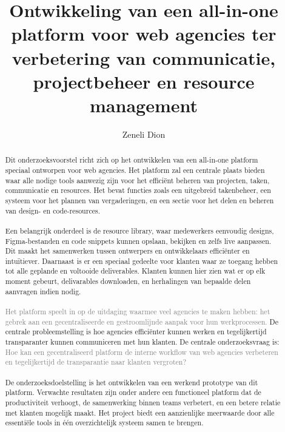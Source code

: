 \documentclass{hogent-article}
\title{Ontwikkeling van een all-in-one platform voor web agencies ter verbetering van communicatie, projectbeheer en resource management}
\author{Zeneli Dion}
\begin{document}
    
    \begin{abstract}
      Dit onderzoeksvoorstel richt zich op het ontwikkelen van een all-in-one platform speciaal ontworpen voor web agencies. Het platform zal een centrale plaats bieden waar alle nodige tools aanwezig zijn voor het efficiënt beheren van projecten, taken, communicatie en resources. Het bevat functies zoals een uitgebreid takenbeheer, een systeem voor het plannen van vergaderingen, en een sectie voor het delen en beheren van design- en code-resources.
      \\
      \\
      Een belangrijk onderdeel is de resource library, waar medewerkers eenvoudig designs, Figma-bestanden en code snippets kunnen opslaan, bekijken en zelfs live aanpassen. Dit maakt het samenwerken tussen ontwerpers en ontwikkelaars efficiënter en intuïtiever. Daarnaast is er een speciaal gedeelte voor klanten waar ze toegang hebben tot alle geplande en voltooide deliverables. Klanten kunnen hier zien wat er op elk moment gebeurt, delivarables downloaden, en herhalingen van bepaalde delen aanvragen indien nodig.
      \\
      \\
      \textcolor{gray}{Het platform speelt in op de uitdaging waarmee veel agencies te maken hebben: het gebrek aan een gecentraliseerde en gestroomlijnde aanpak voor hun werkprocessen.} De centrale probleemstelling is hoe agencies efficiënter kunnen werken en tegelijkertijd transparanter kunnen communiceren met hun klanten. De centrale onderzoeksvraag is: \textcolor{gray}{Hoe kan een gecentraliseerd platform de interne workflow van web agencies verbeteren en tegelijkertijd de transparantie naar klanten vergroten?}
      \\
      \\
      De onderzoeksdoelstelling is het ontwikkelen van een werkend prototype van dit platform. Verwachte resultaten zijn onder andere een functioneel platform dat de productiviteit verhoogt, de samenwerking binnen teams verbetert, en een betere relatie met klanten mogelijk maakt. Het project biedt een aanzienlijke meerwaarde door alle essentiële tools in één overzichtelijk systeem samen te brengen.
    \end{abstract}
    
    \tableofcontents
    
    
    
    \printbibliography[heading=bibintoc]
    
\end{document}
